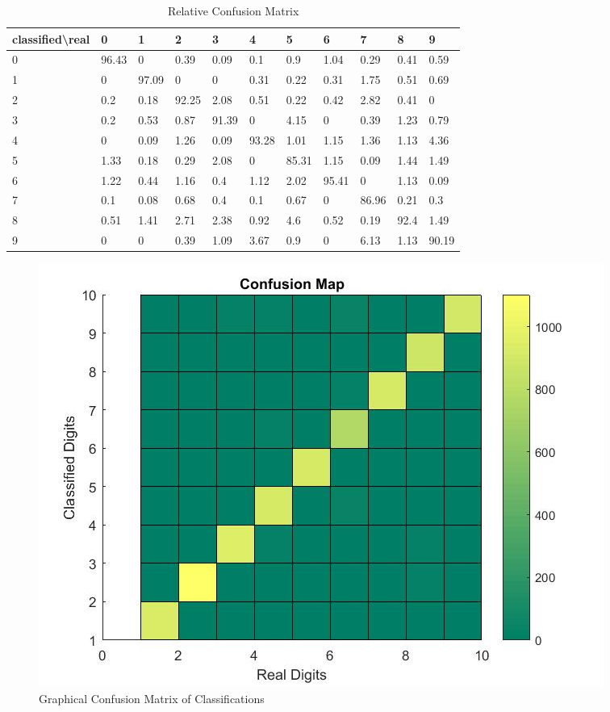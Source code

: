 \documentclass[paper=a4, fontsize=11pt]{scrartcl} %
\numberwithin{equation}{section} %
\numberwithin{figure}{section} %
\numberwithin{table}{section} %
\begin{document}
\begin{table}[H]
\centering
\caption{Relative Confusion Matrix}
\label{tab:relative_confusion}
\begin{tabular}{|l||llllllllll|}
\hline
classified\textbackslash real & 0 & 1 & 2 & 3 & 4 & 5 & 6 & 7 & 8 & 9 \\ \hline\hline
0 & 96.43 & 0 & 0.39 & 0.09 & 0.1 & 0.9 & 1.04 & 0.29 & 0.41 & 0.59 \\ \hline
1 & 0 & 97.09 & 0 & 0 & 0.31 & 0.22 & 0.31 & 1.75 & 0.51 & 0.69 \\ \hline
2 & 0.2 & 0.18 & 92.25 & 2.08 & 0.51 & 0.22 & 0.42 & 2.82 & 0.41 & 0 \\ \hline
3 & 0.2 & 0.53 & 0.87 & 91.39 & 0 & 4.15 & 0 & 0.39 & 1.23 & 0.79 \\ \hline
4 & 0 & 0.09 & 1.26 & 0.09 & 93.28 & 1.01 & 1.15 & 1.36 & 1.13 & 4.36 \\ \hline
5 & 1.33 & 0.18 & 0.29 & 2.08 & 0 & 85.31 & 1.15 & 0.09 & 1.44 & 1.49 \\ \hline
6 & 1.22 & 0.44 & 1.16 & 0.4 & 1.12 & 2.02 & 95.41 & 0 & 1.13 & 0.09 \\ \hline
7 & 0.1 & 0.08 & 0.68 & 0.4 & 0.1 & 0.67 & 0 & 86.96 & 0.21 & 0.3 \\ \hline
8 & 0.51 & 1.41 & 2.71 & 2.38 & 0.92 & 4.6 & 0.52 & 0.19 & 92.4 & 1.49 \\ \hline
9 & 0 & 0 & 0.39 & 1.09 & 3.67 & 0.9 & 0 & 6.13 & 1.13 & 90.19 \\ \hline
\end{tabular}
\end{table}

\begin{figure}[H]
	\centering
	\includegraphics[width = 0.6\linewidth]{./absConfusion.jpg}
	\caption{Graphical Confusion Matrix of Classifications}
	\label{fig:confusion}
\end{figure}
\end{document}
